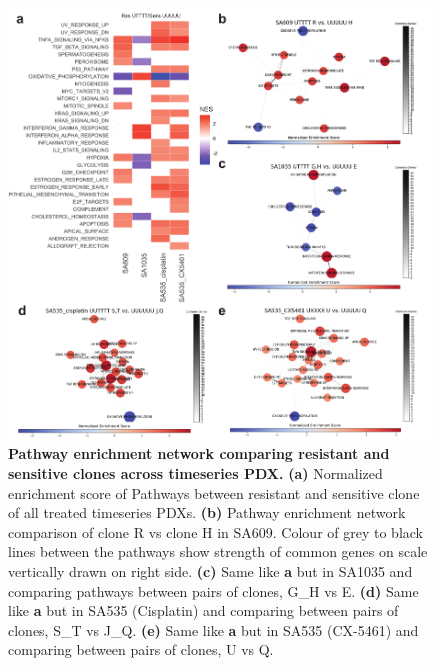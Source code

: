\begin{figure}
\centering
  \includegraphics[width=\textwidth]{Figures/fig6resistantsensitivenetwork.pdf}
\caption[DE of resistant and sensitive clonealign defined clones]
	{\small
	\textbf{Pathway enrichment network comparing resistant and sensitive clones across timeseries PDX.}
	\textbf{(a)} Normalized enrichment score of Pathways between resistant and sensitive clone of all treated timeseries PDXs.
	    \textbf{(b)} Pathway enrichment network comparison of clone R vs clone H in SA609. Colour of grey to black lines between the pathways show strength of common genes on scale vertically drawn on right side. 
	     \textbf{(c)} Same like \textbf{a} but in SA1035  and comparing pathways between pairs of clones, G\_H vs E. 
	     \textbf{(d)} Same like \textbf{a} but in SA535 (Cisplatin) and comparing between pairs of clones, S\_T vs J\_Q.
	 \textbf{(e)} Same like \textbf{a} but in SA535 (CX-5461) and comparing between pairs of clones, U vs Q.}
	
	\label{fig:fig6resistantsensitivenetwork}
\end{figure}












